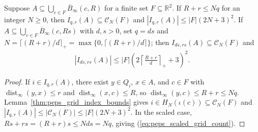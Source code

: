 \begin{lemma}
    \label{thm:peps_scaled_grid_count}
    \leanok
    Suppose $A\subseteq\bigcup_{c\in F}\overline B_\infty(c,R)$ for a finite set
    $F\subseteq\mathbb R^2$. If $R+r\le Nq$ for an integer $N\ge0$, then
    $I_{q,r}(A)\subseteq\mathcal C_N(F)$ and $|I_{q,r}(A)|\le |F|(2N+3)^2$.
    If $A\subseteq\bigcup_{c\in F}\overline B_\infty(c,Rs)$ with $d,s>0$, set
    $q=ds$ and $N=\lceil(R+r)/d\rceil_+=\max\{0,\lceil(R+r)/d\rceil\}$; then
    $I_{ds,rs}(A)\subseteq\mathcal C_N(F)$ and
    \begin{align}
        |I_{ds,rs}(A)|
        \le |F|\left(2\left\lceil\frac{R+r}{d}\right\rceil_++3\right)^2.
        \label{eq:peps_scaled_grid_count}
    \end{align}
\end{lemma}
\begin{proof}
    \leanok
    If $i\in I_{q,r}(A)$, there exist $y\in Q_i$, $x\in A$, and $c\in F$ with
    $\operatorname{dist}_{\infty}(y,x)\le r$ and
    $\operatorname{dist}_{\infty}(x,c)\le R$, so
    $\operatorname{dist}_{\infty}(y,c)\le R+r\le Nq$.
    Lemma~\ref{thm:peps_grid_index_bounds} gives
    $i\in H_N(\iota(c))\subseteq\mathcal C_N(F)$ and
    $|I_{q,r}(A)|\le|\mathcal C_N(F)|\le|F|(2N+3)^2$. In the scaled case,
    $Rs+rs=(R+r)s\le Nds=Nq$, giving (\ref{eq:peps_scaled_grid_count}).
\end{proof}

